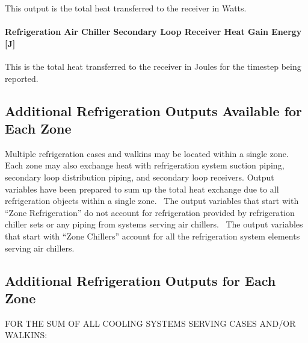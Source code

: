 This output is the total heat transferred to the receiver in Watts.

\paragraph{Refrigeration Air Chiller Secondary Loop Receiver Heat Gain Energy {[}J{]}}\label{refrigeration-air-chiller-secondary-loop-receiver-heat-gain-energy-j}

This is the total heat transferred to the receiver in Joules for the timestep being reported.

\subsection{Additional Refrigeration Outputs Available for Each Zone}\label{additional-refrigeration-outputs-available-for-each-zone}

Multiple refrigeration cases and walkins may be located within a single zone.~ Each zone may also exchange heat with refrigeration system suction piping, secondary loop distribution piping, and secondary loop receivers. Output variables have been prepared to sum up the total heat exchange due to all refrigeration objects within a single zone.~ The output variables that start with ``Zone Refrigeration'' do not account for refrigeration provided by refrigeration chiller sets or any piping from systems serving air chillers.~ The output variables that start with ``Zone Chillers'' account for all the refrigeration system elements serving air chillers.

\subsection{Additional Refrigeration Outputs for Each Zone}\label{additional-refrigeration-outputs-for-each-zone}

FOR THE SUM OF ALL COOLING SYSTEMS SERVING CASES AND/OR WALKINS:

